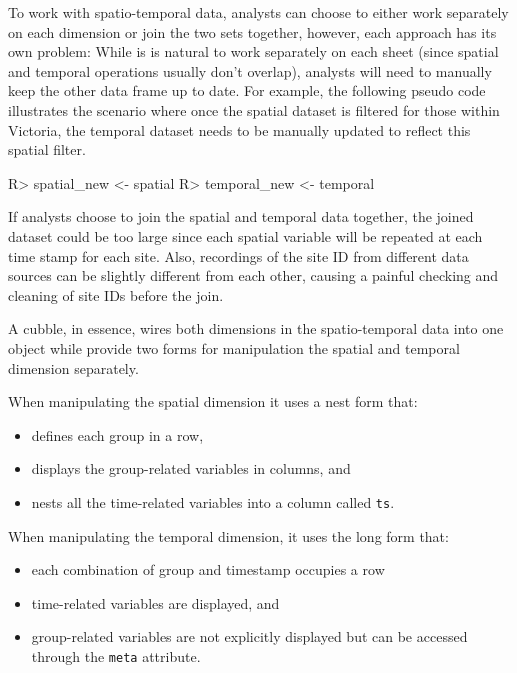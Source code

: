\documentclass[
]{jss}
\providecommand{\tightlist}{%
  \setlength{\itemsep}{0pt}\setlength{\parskip}{0pt}}
\begin{document}
To work with spatio-temporal data, analysts can choose to either work
separately on each dimension or join the two sets together, however,
each approach has its own problem: While is is natural to work
separately on each sheet (since spatial and temporal operations usually
don't overlap), analysts will need to manually keep the other data frame
up to date. For example, the following pseudo code illustrates the
scenario where once the spatial dataset is filtered for those within
Victoria, the temporal dataset needs to be manually updated to reflect
this spatial filter.

\begin{CodeChunk}
\begin{CodeInput}
R> spatial_new <- spatial %
R> temporal_new <- temporal %
\end{CodeInput}
\end{CodeChunk}

If analysts choose to join the spatial and temporal data together, the
joined dataset could be too large since each spatial variable will be
repeated at each time stamp for each site. Also, recordings of the site
ID from different data sources can be slightly different from each
other, causing a painful checking and cleaning of site IDs before the
join.

A cubble, in essence, wires both dimensions in the spatio-temporal data
into one object while provide two forms for manipulation the spatial and
temporal dimension separately.

When manipulating the spatial dimension it uses a nest form that:

\begin{itemize}
\tightlist
\item
  defines each group in a row,
\item
  displays the group-related variables in columns, and
\item
  nests all the time-related variables into a column called \texttt{ts}.
\end{itemize}

When manipulating the temporal dimension, it uses the long form that:

\begin{itemize}
\tightlist
\item
  each combination of group and timestamp occupies a row
\item
  time-related variables are displayed, and
\item
  group-related variables are not explicitly displayed but can be
  accessed through the \texttt{meta} attribute.
\end{itemize}
\end{document}
